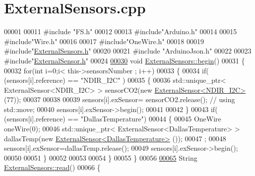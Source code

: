 \hypertarget{_external_sensors_8cpp_source}{}\section{External\+Sensors.\+cpp}

\begin{DoxyCode}
00001 
00011 \textcolor{preprocessor}{#include "FS.h"}
00012 
00013 \textcolor{preprocessor}{#include"Arduino.h"}  
00014 
00015 \textcolor{preprocessor}{#include"Wire.h"}
00016 
00017 \textcolor{preprocessor}{#include"OneWire.h"}
00018 
00019 \textcolor{preprocessor}{#include"\hyperlink{_external_sensors_8h}{ExternalSensors.h}"}
00020 
00021 \textcolor{preprocessor}{#include "ArduinoJson.h"}
00022 
00023 \textcolor{preprocessor}{#include"\hyperlink{_external_sensor_8h}{ExternalSensor.h}"}
00024 
\hyperlink{class_external_sensors_a58ede0d786a86417254708870f04a21e}{00030} \textcolor{keywordtype}{void} \hyperlink{class_external_sensors_a58ede0d786a86417254708870f04a21e}{ExternalSensors::begin}() 
00031 \{
00032     \textcolor{keywordflow}{for}(\textcolor{keywordtype}{int} i=0;i< this->sensorsNumber ; i++)
00033     \{
00034         \textcolor{keywordflow}{if}( (sensors[i].reference) == \textcolor{stringliteral}{"NDIR\_I2C"} )
00035         \{   
00036             std::unique\_ptr< ExternalSensor<NDIR\_I2C> > sensorCO2(\textcolor{keyword}{new} 
      \hyperlink{class_external_sensor_3_01_n_d_i_r___i2_c_01_4}{ExternalSensor<NDIR\_I2C>} (77));
00037 
00038 
00039             sensors[i].exSensor= sensorCO2.release();                       \textcolor{comment}{// using std::move;}
00040             sensors[i].exSensor->begin();
00041 
00042         \}
00043         \textcolor{keywordflow}{if}( (sensors[i].reference) == \textcolor{stringliteral}{"DallasTemperature"})
00044         \{
00045             OneWire oneWire(0);
00046             std::unique\_ptr< ExternalSensor<DallasTemperature> > dallasTemp(\textcolor{keyword}{new} 
      \hyperlink{class_external_sensor_3_01_dallas_temperature_01_4}{ExternalSensor<DallasTemperature>} ());
00047              ;
00048             sensors[i].exSensor=dallasTemp.release();
00049             sensors[i].exSensor->begin();
00050             
00051         \}
00052         
00053         
00054     \}
00055 \}
00056 
\hyperlink{class_external_sensors_a53177b81eca3be89508b5511ddcd00fc}{00065} String \hyperlink{class_external_sensors_a53177b81eca3be89508b5511ddcd00fc}{ExternalSensors::read}()
00066 \{

\end{DoxyCode}

